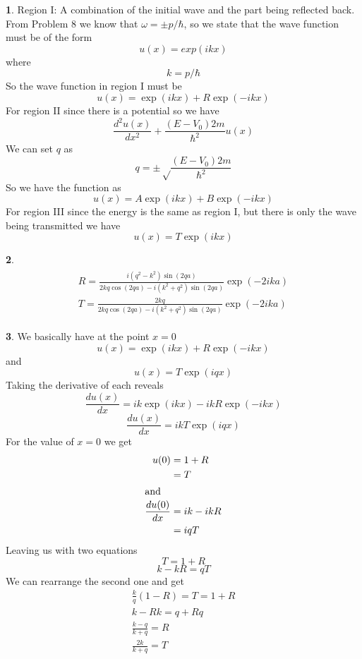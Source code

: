 \documentclass[11pt, twocolumn]{article}
\newcommand{\dif}[2]{\frac{d#1}{d#2}}
\newcommand{\diff}[3]{\frac{d^#3 #1}{d #2^#3}}
\theoremstyle{definition}
\newtheorem{ans}{}
\begin{document}
	\begin{ans}
		Region I:
		A combination of the initial wave and the part being reflected back. 
		From Problem 8 we know that $ \omega = \pm p/\hbar $, so we state that the wave function must be of the form 
		\[ u(x) = exp(ikx) \]
		where 
		\[ k = p/\hbar \]
		So the wave function in region I must be 
		$$ u(x) = \exp(ikx) + R\exp(-ikx) $$
		For region II since there is a potential so we have
		\[ \diff{u(x)}{x}{2} + \frac{(E-V_0) 2m}{\hbar^2} u(x) \]
		We can set $ q $ as 
		\[ q = \pm \sqrt\frac{(E-V_0) 2m}{\hbar^2} \]
		So we have the function as
		\[ u(x) = A \exp (ikx) + B \exp (-ikx) \]
		For region III since the energy is the same as region I, but there is only the wave being transmitted we have 
		\[ u(x) = T \exp(ikx)\]
	\end{ans}
	\begin{ans}
		\begin{align}
		\begin{array} { c } { R = \frac { i \left( q ^ { 2 } - k ^ { 2 } \right) \sin ( 2 q a ) } { 2 k q \cos ( 2 q a ) - i \left( k ^ { 2 } + q ^ { 2 } \right) \sin ( 2 q a ) } \exp ( - 2 i k a ) } \\ { T = \frac { 2 k q } { 2 k q \cos ( 2 q a ) - i \left( k ^ { 2 } + q ^ { 2 } \right) \sin ( 2 q a ) } \exp ( - 2 i k a ) } \end{array}
		\end{align}
	\end{ans}
	\begin{ans}
		We basically have at the point $ x = 0 $
		\[ u(x) = \exp(ikx) + R \exp(-ikx) \]
		and
		\[ u(x) = T \exp(iqx) \]
		Taking the derivative of each reveals 
		\[ \dif{u(x)}{x} = ik\exp(ikx) - ikR \exp(-ikx) \]
		\[ \dif{u(x)}{x} = ik T \exp(iqx) \]
		For the value of $ x = 0 $ we get 
		\begin{align*}
			u(0) &= 1 + R \\
			&= T \\
			\intertext{and}
			\dif{u(0)}{x} &= ik - ikR \\
			&= iqT
		\end{align*}
		Leaving us with two equations
		\[ T = 1 + R \]
		\[ k - kR = qT \]
		We can rearrange the second one and get
		\begin{align*}
			\frac{k}{q} (1 - R) = T = 1 +R \\
			k - Rk = q + Rq \\
			\frac{k-q}{k+q} = R \\
			\frac{2k}{k+q} = T
		\end{align*}
	\end{ans}
\end{document}
